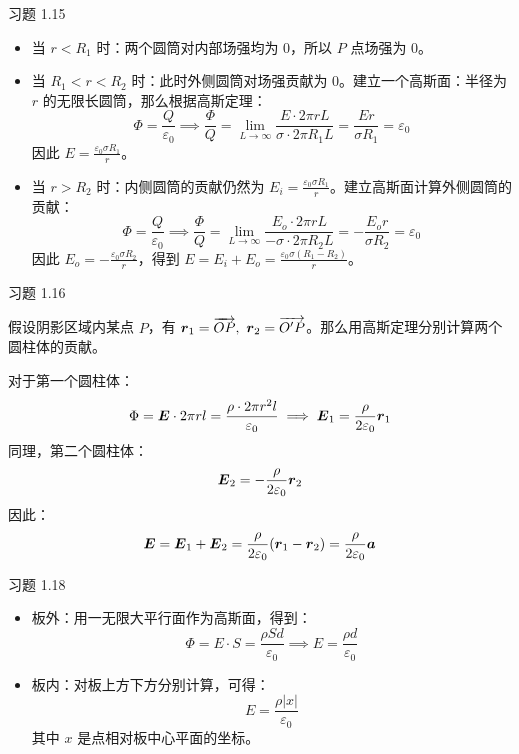 \begin{problem}
	习题 1.15
	\begin{solution}
		\begin{itemize}
			\item 当 $r < R_1$ 时：两个圆筒对内部场强均为 $0$，所以 $P$ 点场强为 $0$。
			\item 当 $R_1 < r < R_2$ 时：此时外侧圆筒对场强贡献为 $0$。建立一个高斯面：半径为 $r$ 的无限长圆筒，那么根据高斯定理：
			$$
			\Phi = \frac{Q}{\varepsilon_0} \implies \frac{\Phi}{Q} = \lim_{L \to \infty} \frac{E \cdot 2\pi r L}{\sigma \cdot 2\pi R_1 L} = \frac{E r}{\sigma R_1} = \varepsilon_0
			$$
			因此 $E = \frac{\varepsilon_0 \sigma R_1}{r}$。

			\item 当 $r > R_2$ 时：内侧圆筒的贡献仍然为 $E_i = \frac{\varepsilon_0 \sigma R_1}{r}$。建立高斯面计算外侧圆筒的贡献：
			$$
			\Phi = \frac{Q}{\varepsilon_0} \implies \frac{\Phi}{Q} = \lim_{L \to \infty} \frac{E_o \cdot 2\pi r L}{-\sigma \cdot 2\pi R_2 L} = -\frac{E_o r}{\sigma R_2} = \varepsilon_0
			$$
			因此 $E_o = - \frac{\varepsilon_0 \sigma R_2}{r}$，得到 $E = E_i + E_o = \frac{\varepsilon_0 \sigma (R_1 - R_2)}{r}$。
		\end{itemize}
	\end{solution}
\end{problem}

\begin{problem}
	习题 1.16
	\begin{solution}
		假设阴影区域内某点 $P$，有 $\boldsymbol{r}_1 = \overrightarrow{OP},\ \boldsymbol{r}_2 = \overrightarrow{O'P}$。那么用高斯定理分别计算两个圆柱体的贡献。

		对于第一个圆柱体：
		$$
		\Phi = \boldsymbol{E} \cdot 2 \pi r l = \frac{\rho \cdot 2\pi r^2 l}{\varepsilon_0} \implies \boldsymbol{E}_1 = \frac{\rho}{2\varepsilon_0} \boldsymbol{r}_1
		$$
		同理，第二个圆柱体：
		$$
		\boldsymbol{E}_2 = - \frac{\rho}{2\varepsilon_0} \boldsymbol{r}_2
		$$
		因此：
		$$
		\boldsymbol{E} = \boldsymbol{E}_1 + \boldsymbol{E}_2 = \frac{\rho}{2\varepsilon_0} (\boldsymbol{r}_1 - \boldsymbol{r}_2) = \frac{\rho}{2\varepsilon_0} \boldsymbol{a}
		$$
	\end{solution}
\end{problem}

\begin{problem}
	习题 1.18
	\begin{solution}
		\begin{itemize}
			\item 板外：用一无限大平行面作为高斯面，得到：
			$$
			\Phi = E \cdot S = \frac{\rho S d}{\varepsilon_0} \implies E = \frac{\rho d}{\varepsilon_0}
			$$
			\item 板内：对板上方下方分别计算，可得：
			$$
			E = \frac{\rho |x|}{\varepsilon_0}
			$$
			其中 $x$ 是点相对板中心平面的坐标。
		\end{itemize}
	\end{solution}
\end{problem}
